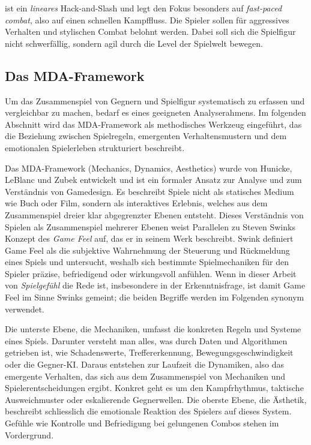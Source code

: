 \documentclass[../Main.tex]{subfiles}
\begin{document}
 ist ein \textit{lineares} Hack-and-Slash und legt den Fokus besonders auf \textit{fast-paced combat}, also auf einen schnellen Kampffluss. Die Spieler sollen für aggressives Verhalten und stylischen Combat belohnt werden. Dabei soll sich die Spielfigur nicht schwerfällig, sondern agil durch die Level der Spielwelt bewegen.

\subsection{Das MDA-Framework}
Um das Zusammenspiel von Gegnern und Spielfigur systematisch zu erfassen und vergleichbar zu machen, bedarf es eines geeigneten Analyserahmens. Im folgenden Abschnitt wird das MDA-Framework als methodisches Werkzeug eingeführt, das die Beziehung zwischen Spielregeln, emergenten Verhaltensmustern und dem emotionalen Spielerleben strukturiert beschreibt.

Das MDA-Framework (Mechanics, Dynamics, Aesthetics) wurde von Hunicke, LeBlanc und Zubek entwickelt und ist ein formaler Ansatz zur Analyse und zum Verständnis von Gamedesign. Es beschreibt Spiele nicht als statisches Medium wie Buch oder Film, sondern als interaktives Erlebnis, welches aus dem Zusammenspiel dreier klar abgegrenzter Ebenen entsteht. Dieses Verständnis von Spielen als Zusammenspiel mehrerer Ebenen weist Parallelen zu Steven Swinks Konzept des \textit{Game Feel} auf, das er in seinem Werk  beschreibt. Swink definiert Game Feel als die subjektive Wahrnehmung der Steuerung und Rückmeldung eines Spiels und untersucht, weshalb sich bestimmte Spielmechaniken für den Spieler präzise, befriedigend oder wirkungsvoll anfühlen.\autocite[s.1-s.6]{swink2008gamefeel} Wenn in dieser Arbeit von \textit{Spielgefühl} die Rede ist, insbesondere in der Erkenntnisfrage, ist damit Game Feel im Sinne Swinks gemeint; die beiden Begriffe werden im Folgenden synonym verwendet.

Die unterste Ebene, die Mechaniken, umfasst die konkreten Regeln und Systeme eines Spiels. Darunter versteht man alles, was durch Daten und Algorithmen getrieben ist, wie Schadenswerte, Treffererkennung, Bewegungsgeschwindigkeit oder die Gegner-KI. Daraus entstehen zur Laufzeit die Dynamiken, also das emergente Verhalten, das sich aus dem Zusammenspiel von Mechaniken und Spielerentscheidungen ergibt. Konkret geht es um den Kampfrhythmus, taktische Ausweichmuster oder eskalierende Gegnerwellen. Die oberste Ebene, die Ästhetik, beschreibt schliesslich die emotionale Reaktion des Spielers auf dieses System. Gefühle wie Kontrolle und Befriedigung bei gelungenen Combos stehen im Vordergrund.
\end{document}
